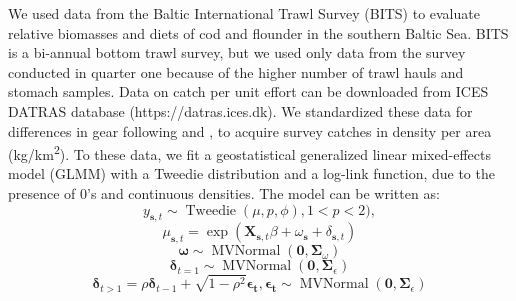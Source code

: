 \documentclass{article}
\begin{document}
We used data from the Baltic International Trawl Survey (BITS) to evaluate relative biomasses and diets of cod and flounder in the southern Baltic Sea. BITS is a bi-annual bottom trawl survey, but we used only data from the survey conducted in quarter one because of the higher number of trawl hauls and stomach samples. Data on catch per unit effort can be downloaded from ICES DATRAS database (https://datras.ices.dk). We standardized these data for differences in gear following \citet{Orio2017} and \citet{Lindmark2023}, to acquire survey catches in density per area (kg/km\textsuperscript{2}). To these data, we fit a geostatistical generalized linear mixed-effects model (GLMM) with a Tweedie distribution \citep{Tweedie1984, Shono2008, Anderson2019} and a log-link function, due to the presence of 0's and continuous densities. The model can be written as:
%
\begin{equation}
    \label{eq:si_spatiotemporal1}
    y_{\boldsymbol{s}, t} \sim \operatorname{Tweedie} (\mu, p, \phi), 1<p<2),
\end{equation}
%
\begin{equation}
    \label{eq:si_spatiotemporal2}
    \mu_{{\boldsymbol{s}, t}}= \exp (\boldsymbol{X}_{\boldsymbol{s}, t}\beta + \omega_{\boldsymbol{s}} + \delta_{\boldsymbol{s}, t})
\end{equation}
%
\begin{equation}
    \label{eq:si_spatiotemporal3}
    \boldsymbol{\omega} \sim \operatorname{MVNormal} (\boldsymbol{0},\boldsymbol{\Sigma}_\omega)
\end{equation}
%
\begin{equation}
    \label{eq:si_spatiotemporal4}
    \boldsymbol{\delta}_{t=1} \sim \operatorname{MVNormal} (\boldsymbol{0}, \boldsymbol{\Sigma}_{\epsilon})
\end{equation}
%
\begin{equation}
    \label{eq:si_spatiotemporal5}
        \boldsymbol{\delta}_{t>1} = \rho \boldsymbol{\delta}_{t-1} + \sqrt{1 - \rho^2} \boldsymbol{\epsilon_{t}}, \boldsymbol{\epsilon_{t}} \sim \operatorname{MVNormal}(\boldsymbol{0}, \boldsymbol{\Sigma}_{\epsilon})
\end{equation}
%
\end{document}
